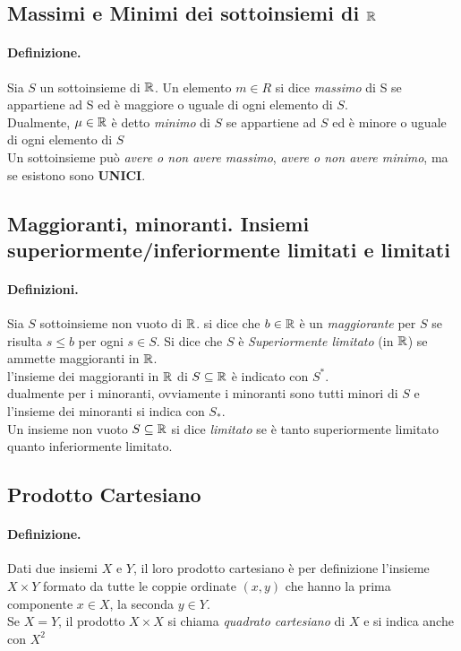 \documentclass[12pt, a4paper, openany]{book}
\begin{document}
\subsection*{Massimi e Minimi dei sottoinsiemi di $\mathbb{R}$}
\paragraph{Definizione.} Sia $S$ un sottoinsieme di $\mathbb{R}$. Un elemento $m\in R$ si dice \emph{massimo} di S se appartiene ad S ed è maggiore o uguale di ogni elemento di $S$.
\\Dualmente, $\mu \in \mathbb{R} $ è detto \emph{minimo} di $S$ se appartiene ad $S$ ed è minore o uguale di ogni elemento di $S$
\\Un sottoinsieme può \emph{avere o non avere massimo}, \emph{avere o non avere minimo}, ma se esistono sono \textbf{UNICI}.

\subsection*{Maggioranti, minoranti. Insiemi superiormente/inferiormente limitati e limitati}
\paragraph{Definizioni.} Sia $S$ sottoinsieme non vuoto di $\mathbb{R}$. si dice che $b\in \mathbb{R}$ è un \emph{maggiorante} per $S$ se risulta $s\leq b$ per ogni $s \in S$. Si dice che $S$ è \emph{Superiormente limitato} (in $\mathbb{R}$) se ammette maggioranti in $\mathbb{R}$.
\\l'insieme dei maggioranti in $\mathbb{R}$ di $S\subseteq \mathbb{R}$ è indicato con $S^*$.
\\dualmente per i minoranti, ovviamente i minoranti sono tutti minori di $S$ e l'insieme dei minoranti si indica con $S_*$.
\\Un insieme non vuoto $S \subseteq \mathbb{R}$ si dice \emph{limitato} se è tanto superiormente limitato quanto inferiormente limitato.
\subsection*{Prodotto Cartesiano}
\paragraph{Definizione.}Dati due insiemi $X$ e $Y$, il loro prodotto cartesiano è per definizione l'insieme $X \times Y$ formato da tutte le coppie ordinate $(x,y)$ che hanno la prima componente $x \in X$, la seconda $y \in Y$.\\
Se $X = Y$, il prodotto $X \times X$ si chiama \emph{quadrato cartesiano} di $X$ e si indica anche con $X^2$
\end{document}
